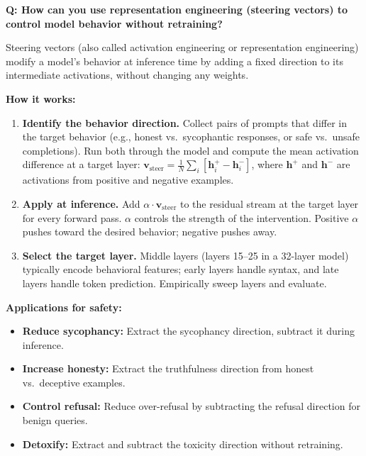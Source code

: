 
\begin{interviewq}
\textbf{Q: How can you use representation engineering (steering vectors) to control model behavior without retraining?}

 \quad {} \quad \badgefreq{\freqlow}

\stronganswer

Steering vectors (also called activation engineering or representation engineering) modify a model's behavior at inference time by adding a fixed direction to its intermediate activations, without changing any weights.

\textbf{How it works:}
\begin{enumerate}
    \item \textbf{Identify the behavior direction.} Collect pairs of prompts that differ in the target behavior (e.g., honest vs.\ sycophantic responses, or safe vs.\ unsafe completions). Run both through the model and compute the mean activation difference at a target layer: $\mathbf{v}_{\text{steer}} = \frac{1}{N}\sum_i [\mathbf{h}_i^{+} - \mathbf{h}_i^{-}]$, where $\mathbf{h}^{+}$ and $\mathbf{h}^{-}$ are activations from positive and negative examples.
    \item \textbf{Apply at inference.} Add $\alpha \cdot \mathbf{v}_{\text{steer}}$ to the residual stream at the target layer for every forward pass. $\alpha$ controls the strength of the intervention. Positive $\alpha$ pushes toward the desired behavior; negative pushes away.
    \item \textbf{Select the target layer.} Middle layers (layers 15--25 in a 32-layer model) typically encode behavioral features; early layers handle syntax, and late layers handle token prediction. Empirically sweep layers and evaluate.
\end{enumerate}

\textbf{Applications for safety:}
\begin{itemize}
    \item \textbf{Reduce sycophancy:} Extract the sycophancy direction, subtract it during inference.
    \item \textbf{Increase honesty:} Extract the truthfulness direction from honest vs.\ deceptive examples.
    \item \textbf{Control refusal:} Reduce over-refusal by subtracting the refusal direction for benign queries.
    \item \textbf{Detoxify:} Extract and subtract the toxicity direction without retraining.
\end{itemize}


\end{interviewq}
